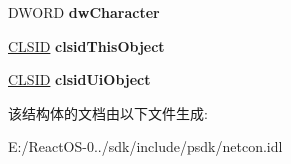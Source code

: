 \begin{DoxyCompactItemize}
D\+W\+O\+RD {\bfseries dw\+Character}
\item 
\mbox{\label{struct_i_net_connection_1_1tag_n_e_t_c_o_n___p_r_o_p_e_r_t_i_e_s_a1716dd5668032c7251381ead4dd39e42}} 
\hyperlink{struct___i_i_d}{C\+L\+S\+ID} {\bfseries clsid\+This\+Object}
\item 
\mbox{\label{struct_i_net_connection_1_1tag_n_e_t_c_o_n___p_r_o_p_e_r_t_i_e_s_a8f4a91d02f409556facb13f95fa618b4}} 
\hyperlink{struct___i_i_d}{C\+L\+S\+ID} {\bfseries clsid\+Ui\+Object}
\end{DoxyCompactItemize}


该结构体的文档由以下文件生成\+:\begin{DoxyCompactItemize}
\item 
E\+:/\+React\+O\+S-\/0../sdk/include/psdk/netcon.\+idl\end{DoxyCompactItemize}

